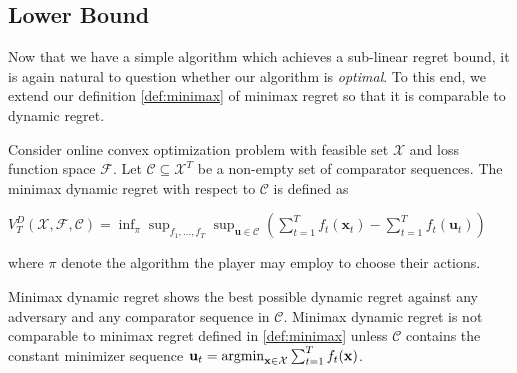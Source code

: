 \documentclass[12pt, a4paper]{report}
\begin{document}
\subsection{Lower Bound}
Now that we have a simple algorithm which achieves a sub-linear regret bound, it is again natural to question whether our algorithm is \textit{optimal}. To this end, we extend our definition \ref{def:minimax} of minimax regret so that it is comparable to dynamic regret.

\begin{defn}
Consider online convex optimization problem with feasible set $\mathcal{X}$ and loss function space $\mathcal{F}$. Let $\mathcal{C} \subseteq \mathcal{X}^T$ be a non-empty set of comparator sequences. The minimax dynamic regret with respect to $\mathcal{C}$ is defined as
\begin{center}
    $\displaystyle V_T^D(\mathcal{X}, \mathcal{F}, \mathcal{C}) = \inf_{\pi} \sup_{f_1, \dots, f_T} \sup_{\mathbf{u} \in \mathcal{C}} \left( \sum_{t=1}^T f_t(\mathbf{x}_t) - \sum_{t=1}^T f_t(\mathbf{u}_t) \right)$
\end{center}
where $\pi$ denote the algorithm the player may employ to choose their actions.
\end{defn}
Minimax dynamic regret shows the best possible dynamic regret against any adversary and any comparator sequence in $\mathcal{C}$. Minimax dynamic regret is not comparable to minimax regret defined in \ref{def:minimax} unless $\mathcal{C}$ contains the constant minimizer sequence $\mathbf{u}_t = \operatorname*{argmin}_{\mathbf{x} \in \mathcal{X}} \sum_{t=1}^T f_t(\mathbf{x})$. 
\end{document}
